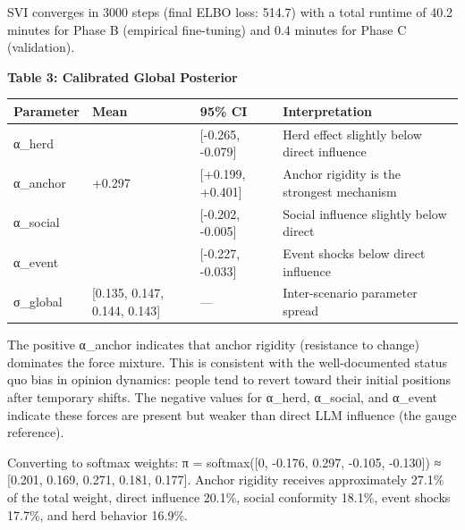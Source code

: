 \documentclass[
]{article}
\begin{document}
SVI converges in 3000 steps (final ELBO loss: 514.7) with a total
runtime of 40.2 minutes for Phase B (empirical fine-tuning) and 0.4
minutes for Phase C (validation).

\textbf{Table 3: Calibrated Global Posterior}

\begin{longtable}[]{@{}
  >{\raggedright\arraybackslash}p{}
  >{\raggedright\arraybackslash}p{}
  >{\raggedright\arraybackslash}p{}
  >{\raggedright\arraybackslash}p{}@{}}
\toprule\noalign{}
\begin{minipage}[b]{\linewidth}\raggedright
Parameter
\end{minipage} & \begin{minipage}[b]{\linewidth}\raggedright
Mean
\end{minipage} & \begin{minipage}[b]{\linewidth}\raggedright
95\% CI
\end{minipage} & \begin{minipage}[b]{\linewidth}\raggedright
Interpretation
\end{minipage} \\
\midrule\noalign{}
\endhead
\bottomrule\noalign{}
\endlastfoot
α\_herd & -0.176 & {[}-0.265, -0.079{]} & Herd effect slightly below
direct influence \\
α\_anchor & +0.297 & {[}+0.199, +0.401{]} & Anchor rigidity is the
strongest mechanism \\
α\_social & -0.105 & {[}-0.202, -0.005{]} & Social influence slightly
below direct \\
α\_event & -0.130 & {[}-0.227, -0.033{]} & Event shocks below direct
influence \\
σ\_global & {[}0.135, 0.147, 0.144, 0.143{]} & --- & Inter-scenario
parameter spread \\
\end{longtable}

The positive α\_anchor indicates that anchor rigidity (resistance to
change) dominates the force mixture. This is consistent with the
well-documented status quo bias in opinion dynamics: people tend to
revert toward their initial positions after temporary shifts. The
negative values for α\_herd, α\_social, and α\_event indicate these
forces are present but weaker than direct LLM influence (the gauge
reference).

Converting to softmax weights: π = softmax({[}0, -0.176, 0.297, -0.105,
-0.130{]}) ≈ {[}0.201, 0.169, 0.271, 0.181, 0.177{]}. Anchor rigidity
receives approximately 27.1\% of the total weight, direct influence
20.1\%, social conformity 18.1\%, event shocks 17.7\%, and herd behavior
16.9\%.
\end{document}
